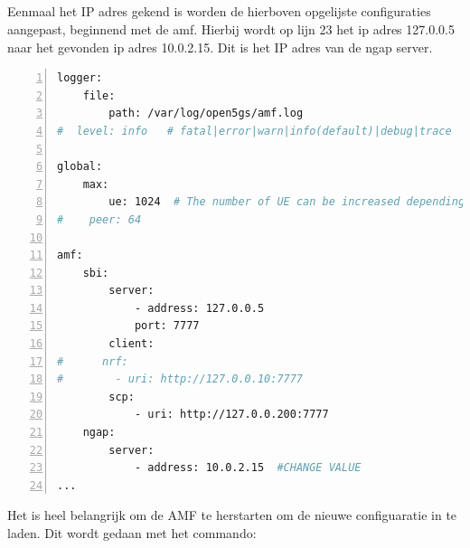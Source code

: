 \subsection{}%
\label{sec:open5gs_amf}%

Eenmaal het IP adres gekend is worden de hierboven opgelijste configuraties aangepast, beginnend met de amf. Hierbij wordt op lijn 23 het ip adres 127.0.0.5 naar het gevonden ip adres 10.0.2.15. Dit is het IP  adres van de ngap server.

\begin{lstlisting}[basicstyle=\small, frame=single, breaklines=true, postbreak=\mbox{\textcolor{red}{$\hookrightarrow$}\space}, escapeinside ={\%,}, escapechar={!}, numbers=left, language=sh, caption=Open5GS amf configuratie]
logger:
    file:
        path: /var/log/open5gs/amf.log
#  level: info   # fatal|error|warn|info(default)|debug|trace

global:
    max:
        ue: 1024  # The number of UE can be increased depending on memory size.
#    peer: 64

amf:
    sbi:
        server:
            - address: 127.0.0.5
            port: 7777
        client:
#      nrf:
#        - uri: http://127.0.0.10:7777
        scp:
            - uri: http://127.0.0.200:7777
    ngap:
        server:
            - address: 10.0.2.15  #CHANGE VALUE
...
\end{lstlisting}

Het is heel belangrijk om de AMF te herstarten om de nieuwe configuaratie in te laden. Dit wordt gedaan met het commando: 

\subsection{}%
\label{sec:gnb_config}%

